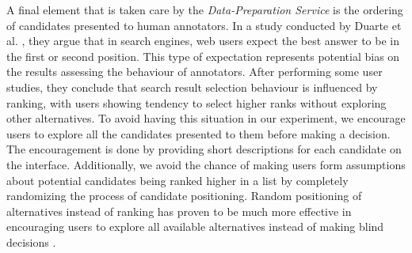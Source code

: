 A final element that is taken care by the \textit{Data-Preparation Service} is the ordering of candidates presented to human annotators. In a study conducted by Duarte et al. \cite{34}, they argue that in search engines, web users expect the best answer to be in the first or second position. This type of expectation represents potential bias on the results assessing the behaviour of annotators. After performing some user studies, they conclude that search result selection behaviour is influenced by ranking, with users showing tendency to select higher ranks without exploring other alternatives. To avoid having this situation in our experiment, we encourage users to explore all the candidates presented to them before making a decision. The encouragement is done by providing short descriptions for each candidate on the interface. Additionally, we avoid the chance of making users form assumptions about potential candidates being ranked higher in a list by completely randomizing the process of candidate positioning. Random positioning of alternatives instead of ranking has proven to be much more effective in encouraging users to explore all available alternatives instead of making blind decisions \cite{34}.
